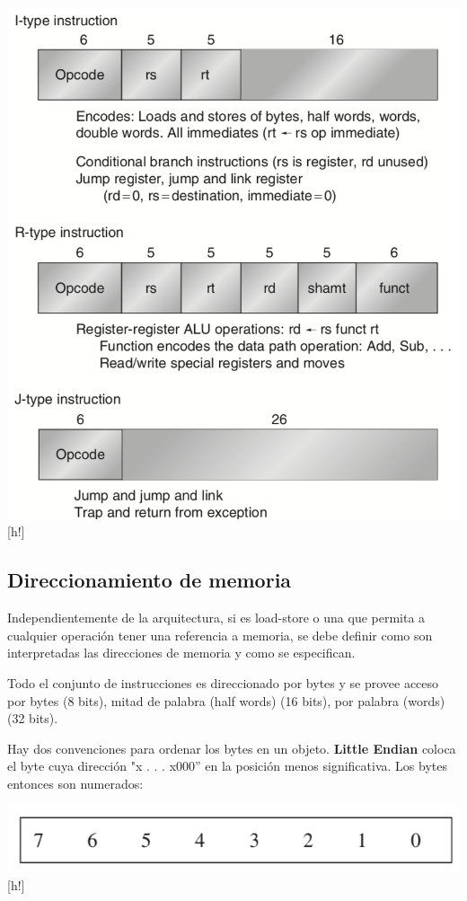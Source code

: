 \begin{center}
 \includegraphics[scale=.65,keepaspectratio=true]{gfx/tipos_instruccion.png}[h!]
\end{center}

\subsection{Direccionamiento de memoria}
Independientemente de la arquitectura, si es load-store o una que permita a cualquier operación tener una referencia a memoria, se debe definir como son interpretadas las direcciones de memoria y como se especifican.

Todo el conjunto de instrucciones es direccionado por bytes y se provee acceso por bytes (8 bits), mitad de palabra (half words) (16 bits), por palabra (words) (32 bits).

Hay dos convenciones para ordenar los bytes en un objeto. \textbf{Little Endian} coloca el byte cuya dirección "x . . . x000” en la posición menos significativa. Los bytes entonces son numerados:

\begin{center}
 \includegraphics[scale=.7,keepaspectratio=true]{gfx/little_endian.png}[h!]
\end{center}


